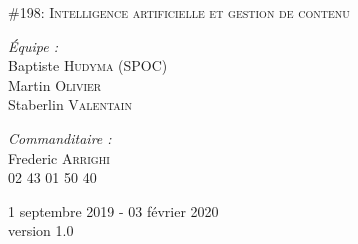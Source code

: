 \begin{titlepage}
\begin{center}
\vspace{0.4cm}
\textsc {\large \#198: Intelligence artificielle et gestion de contenu }\\[1.5cm]

\vspace{7cm}

\begin{minipage}{0.4\textwidth}
\begin{flushleft} \large
	\emph{Équipe :}\\
	Baptiste \textsc{Hudyma} (SPOC)\\
	Martin \textsc{Olivier}\\
	Staberlin \textsc{Valentain}
\end{flushleft}
\end{minipage}
\begin{minipage}{0.5\textwidth}
\begin{flushright} \large
	\emph{Commanditaire :}\\
	Frederic \textsc{Arrighi}\\
	02 43 01 50 40
\end{flushright}
\end{minipage}

\vfill

{\large 1\ier{} septembre 2019 - 03 février 2020}\\
{version 1.0}

\end{center}
\end{titlepage}
